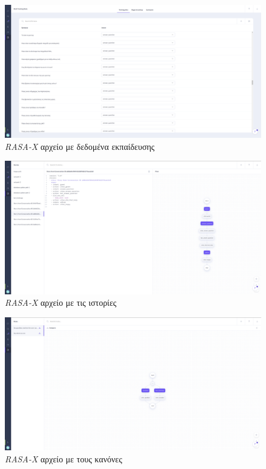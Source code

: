 \begin{figure}[!ht]
  \centering
  \captionsetup{justification=centering}
  \includegraphics[width=1\textwidth]{images/appendix/rasax-training.png}
  \caption{\emph{RASA-X} αρχείο με δεδομένα εκπαίδευσης}
  \label{fig:rasax-training}
\end{figure}
\noindent

\begin{figure}[!ht]
  \centering
  \captionsetup{justification=centering}
  \includegraphics[width=1\textwidth]{images/appendix/rasax-stories.png}
  \caption{\emph{RASA-X} αρχείο με τις ιστορίες}
  \label{fig:rasax-stories}
\end{figure}
\noindent

\begin{figure}[!ht]
  \centering
  \captionsetup{justification=centering}
  \includegraphics[width=1\textwidth]{images/appendix/rasax-rules.png}
  \caption{\emph{RASA-X} αρχείο με τους κανόνες}
  \label{fig:rasax-rules}
\end{figure}
\noindent

